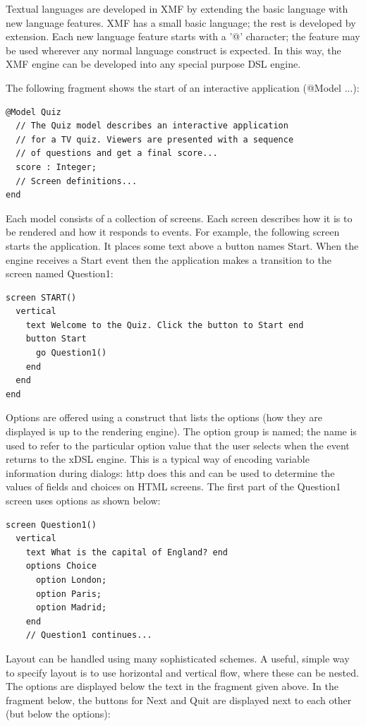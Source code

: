 Textual languages are developed in XMF by extending the basic language
with new language features. XMF has a small basic language; the rest
is developed by extension. Each new language feature starts with a
'@' character; the feature may be used wherever any normal language
construct is expected. In this way, the XMF engine can be developed
into any special purpose DSL engine.

The following fragment shows the start of an interactive application
(@Model ...):

\begin{lstlisting}
@Model Quiz
  // The Quiz model describes an interactive application
  // for a TV quiz. Viewers are presented with a sequence
  // of questions and get a final score...
  score : Integer;
  // Screen definitions...
end
\end{lstlisting}Each model consists of a collection of screens. Each screen describes
how it is to be rendered and how it responds to events. For example,
the following screen starts the application. It places some text above
a button names Start. When the engine receives a Start event then
the application makes a transition to the screen named Question1:

\begin{lstlisting}
screen START()
  vertical
    text Welcome to the Quiz. Click the button to Start end
    button Start
      go Question1()
    end
  end
end
\end{lstlisting}Options are offered using a construct that lists the options (how
they are displayed is up to the rendering engine). The option group
is named; the name is used to refer to the particular option value
that the user selects when the event returns to the xDSL engine. This
is a typical way of encoding variable information during dialogs:
http does this and can be used to determine the values of fields and
choices on HTML screens. The first part of the Question1 screen uses
options as shown below:

\begin{lstlisting}
screen Question1()
  vertical
    text What is the capital of England? end
    options Choice
      option London; 
      option Paris;
      option Madrid;
    end
    // Question1 continues...
\end{lstlisting}Layout can be handled using many sophisticated schemes. A useful,
simple way to specify layout is to use horizontal and vertical flow,
where these can be nested. The options are displayed below the text
in the fragment given above. In the fragment below, the buttons for
Next and Quit are displayed next to each other (but below the options):

